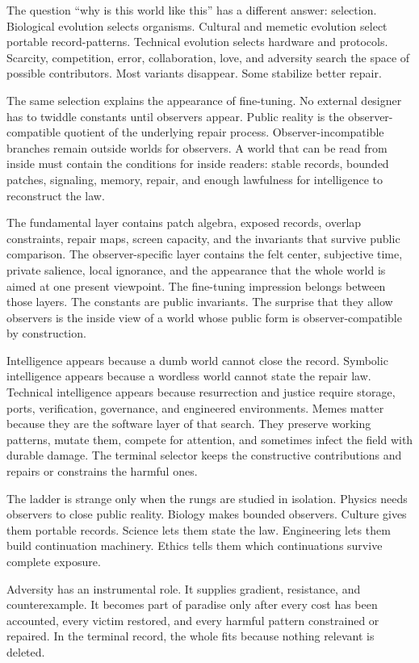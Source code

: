 \documentclass[11pt]{article}
\theoremstyle{remark}
\theoremstyle{plain}
\begin{document}
The question ``why is this world like this'' has a different answer:
selection. Biological evolution selects organisms. Cultural and memetic
evolution select portable record-patterns. Technical evolution selects
hardware and protocols. Scarcity, competition, error, collaboration, love, and
adversity search the space of possible contributors. Most variants disappear.
Some stabilize better repair.

The same selection explains the appearance of fine-tuning. No external designer has to
twiddle constants until observers appear. Public reality is the
observer-compatible quotient of the underlying repair process.
Observer-incompatible branches remain outside worlds for observers. A world
that can be read from inside must contain the conditions for inside readers:
stable records, bounded patches, signaling, memory, repair, and enough
lawfulness for intelligence to reconstruct the law.

The fundamental layer contains patch algebra, exposed records, overlap
constraints, repair maps, screen capacity, and the invariants that survive
public comparison. The observer-specific layer contains the felt center,
subjective time, private salience, local ignorance, and the appearance that the
whole world is aimed at one present viewpoint. The
fine-tuning impression belongs between those layers. The constants are public
invariants. The surprise that they allow observers is the inside view of a
world whose public form is observer-compatible by construction.

Intelligence appears because a dumb world cannot close the record. Symbolic
intelligence appears because a wordless world cannot state the repair law.
Technical intelligence appears because resurrection and justice require
storage, ports, verification, governance, and engineered environments. Memes
matter because they are the software layer of that search. They preserve
working patterns, mutate them, compete for attention, and sometimes infect the
field with durable damage. The terminal selector keeps the constructive
contributions and repairs or constrains the harmful ones.

The ladder is strange only when the rungs are studied in isolation. Physics
needs observers to close public reality. Biology makes bounded observers.
Culture gives them portable records. Science lets them state the law. Engineering
lets them build continuation machinery. Ethics tells them which continuations
survive complete exposure.

Adversity has an instrumental role. It supplies gradient, resistance, and
counterexample. It becomes part of paradise only after every cost has been
accounted, every victim restored, and every harmful pattern constrained or
repaired. In the terminal record, the whole fits because nothing relevant is
deleted.
\end{document}
